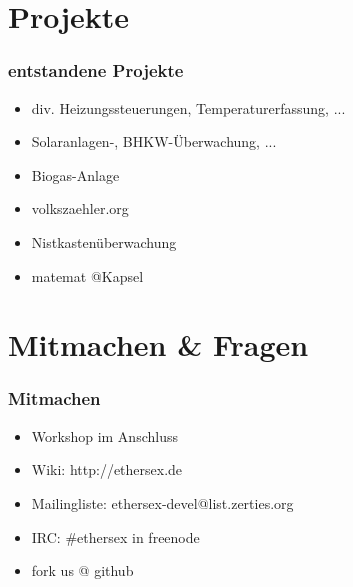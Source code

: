 \documentclass[utf8, xcolor=dvipsnames]{beamer}
\begin{document}
\section{Projekte}
\begin{frame}
  \frametitle{entstandene Projekte}

  \begin{itemize}
  \item div. Heizungssteuerungen, Temperaturerfassung, ...
  \item Solaranlagen-, BHKW-Überwachung, ...
  \item Biogas-Anlage
  \item volkszaehler.org
  \item Nistkastenüberwachung
  \item matemat @Kapsel
  \end{itemize}

\end{frame}

\section{Mitmachen \& Fragen}
\begin{frame}
  \frametitle{Mitmachen}
  \begin{itemize}
  \item Workshop im Anschluss
  \item Wiki: http://ethersex.de
  \item Mailingliste: ethersex-devel@list.zerties.org
  \item IRC:  \#ethersex in freenode
  \item fork us @ github
  \end{itemize}

\end{frame}

\end{document}
